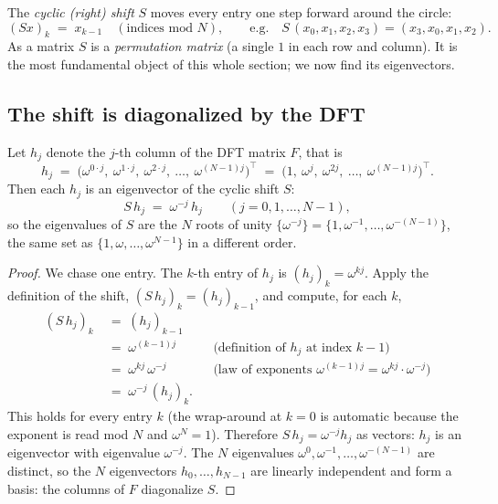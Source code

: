 \begin{definition}
\label{def:shift}
The \emph{cyclic (right) shift} $S$ moves every entry one step forward around the
circle:
\[
  (S x)_k \;=\; x_{k-1} \quad (\text{indices mod } N),
  \qquad\text{e.g.}\quad S\,(x_0,x_1,x_2,x_3) = (x_3,x_0,x_1,x_2).
\]
As a matrix $S$ is a \emph{permutation matrix} (a single $1$ in each row and column).
It is the most fundamental object of this whole section; we now find its eigenvectors.
\end{definition}

\subsection{The shift is diagonalized by the DFT}

\begin{theorem}
\label{thm:shifteig}
Let $h_j$ denote the $j$-th column of the DFT matrix $F$, that is
\[
  h_j \;=\; \bigl(\omega^{0\cdot j},\ \omega^{1\cdot j},\ \omega^{2\cdot j},\ \dots,\
            \omega^{(N-1)j}\bigr)^{\!\top}
        \;=\; \bigl(1,\ \omega^{j},\ \omega^{2j},\ \dots,\ \omega^{(N-1)j}\bigr)^{\!\top}.
\]
Then each $h_j$ is an eigenvector of the cyclic shift $S$:
\[
  S\, h_j \;=\; \omega^{-j}\, h_j \qquad (j = 0,1,\dots,N-1),
\]
so the eigenvalues of $S$ are the $N$ roots of unity $\{\omega^{-j}\} = \{1, \omega^{-1},
\dots, \omega^{-(N-1)}\}$, the same set as $\{1, \omega, \dots, \omega^{N-1}\}$ in a
different order.
\end{theorem}

\begin{proof}
We chase one entry. The $k$-th entry of $h_j$ is $(h_j)_k = \omega^{kj}$. Apply the
definition of the shift, $(S\,h_j)_k = (h_j)_{k-1}$, and compute, for each $k$,
\begin{align*}
  (S\, h_j)_k \;&=\; (h_j)_{k-1} \\
              \;&=\; \omega^{(k-1)j}
                  &&\text{(definition of $h_j$ at index $k-1$)} \\
              \;&=\; \omega^{kj}\,\omega^{-j}
                  &&\text{(law of exponents $\omega^{(k-1)j} = \omega^{kj}\cdot\omega^{-j}$)} \\
              \;&=\; \omega^{-j}\,(h_j)_k .
\end{align*}
This holds for every entry $k$ (the wrap-around at $k=0$ is automatic because the
exponent is read mod $N$ and $\omega^{N} = 1$). Therefore $S\,h_j = \omega^{-j} h_j$ as
vectors: $h_j$ is an eigenvector with eigenvalue $\omega^{-j}$. The $N$ eigenvalues
$\omega^{0}, \omega^{-1}, \dots, \omega^{-(N-1)}$ are distinct, so the $N$ eigenvectors
$h_0,\dots,h_{N-1}$ are linearly independent and form a basis: the columns of $F$
diagonalize $S$.
\end{proof}


